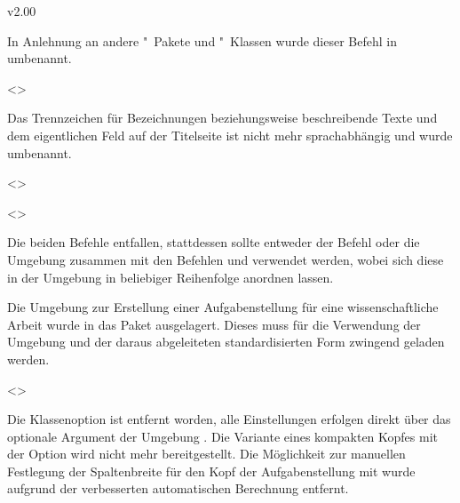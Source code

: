 \begin{NoIndexDefault}
\begin{Cessations}{v2.00}
\begin{Cessation}
In Anlehnung an andere "~Pakete und "~Klassen wurde 
dieser Befehl in  umbenannt.
\end{Cessation}

\begin{Cessation}
  {}
  <>
\printdeclarationlist

Das Trennzeichen für Bezeichnungen beziehungsweise beschreibende Texte und dem 
eigentlichen Feld auf der Titelseite ist nicht mehr sprachabhängig und wurde 
umbenannt.
\end{Cessation}

\begin{Cessation}
  {}
  <>
\begin{Cessation}
  {}
  <>
\printdeclarationlist

Die beiden Befehle entfallen, stattdessen sollte entweder der Befehl 
 oder die Umgebung  zusammen mit 
den Befehlen  und  verwendet werden, wobei 
sich diese in der Umgebung in beliebiger Reihenfolge anordnen lassen.
\end{Cessation}
\end{Cessation}


\minisec{\taskname}

\begin{Entity}{}
Die Umgebung zur Erstellung einer Aufgabenstellung für eine wissenschaftliche 
Arbeit wurde in das Paket  ausgelagert. Dieses muss 
für die Verwendung der Umgebung  und der daraus abgeleiteten 
standardisierten Form zwingend geladen werden.

\begin{Cessation}
  {}
  <>
\begin{Cessation}
  {}
\begin{Cessation}
  {}
\printdeclarationlist

Die Klassenoption  ist entfernt worden, alle Einstellungen 
erfolgen direkt über das optionale Argument der Umgebung . 
Die Variante eines kompakten Kopfes mit der Option  wird 
nicht mehr bereitgestellt. Die Möglichkeit zur manuellen Festlegung der 
Spaltenbreite für den Kopf der Aufgabenstellung mit  wurde 
aufgrund der verbesserten automatischen Berechnung entfernt.
\end{Cessation}
\end{Cessation}
\end{Cessation}


\end{Entity}
\end{Cessations}
\end{NoIndexDefault}
